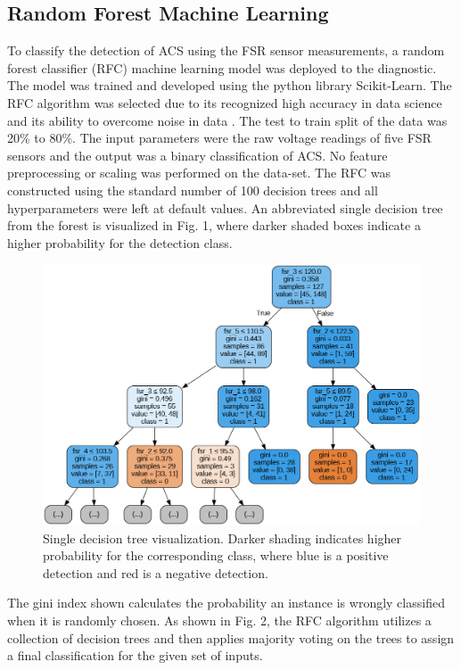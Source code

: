 \documentclass[times, twoside]{zHenriquesLab-StyleBioRxiv}
\begin{document}
\subsection*{Random Forest Machine Learning}
To classify the detection of ACS using the FSR sensor measurements, a random forest classifier (RFC) machine learning model was deployed to the diagnostic. The model was trained and developed using the python library Scikit-Learn. The RFC algorithm was selected due to its recognized high accuracy in data science and its ability to overcome noise in data \cite{reis2018probabilistic}. The test to train split of the data was 20\% to 80\%. The input parameters were the raw voltage readings of five FSR sensors and the output was a binary classification of ACS. No feature preprocessing or scaling was performed on the data-set. The RFC was constructed using the standard number of 100 decision trees and all hyperparameters were left at default values. An abbreviated single decision tree from the forest is visualized in Fig. 1, where darker shaded boxes indicate a higher probability for the detection class. 

\begin{figure}[H] %
    \centering
    \includegraphics[width=1\linewidth]{decision_tree.png}
    \caption{Single decision tree visualization. Darker shading indicates higher probability for the corresponding class, where blue is a positive detection and red is a negative detection.}
    \label{fig:decisionTree}
\end{figure}

The gini index shown calculates the probability an instance is wrongly classified when it is randomly chosen.
As shown in Fig. 2, the RFC algorithm utilizes a collection of decision trees and then applies majority voting on the trees to assign a final classification for the given set of inputs.
\end{document}
